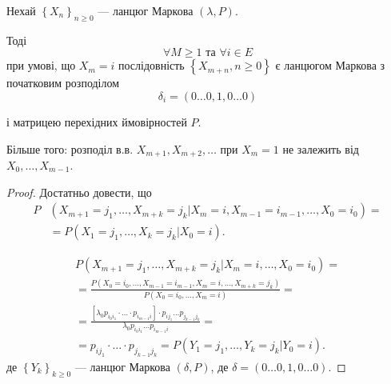 \begin{theorem}
  Нехай $\left\{ X_n \right\}_{n \geq 0} $ --- ланцюг Маркова $(\lambda, P)$.

  Тоді \[ \forall M \geq 1 \text{ та } \forall i \in  E \] при умові, що $X_m = i$
  послідовність  $\left\{ X_{m+n}, n \geq 0 \right\}$ є ланцюгом Маркова з початковим розподілом
  \[ \delta_i = \left( 0 \ldots 0, 1, 0 \ldots 0 \right) \] 

  і матрицею перехідних ймовірностей $P$.

  Більше того: розподіл в.в. $X_{m+1}, X_{m+2}, \ldots$ при $X_{m}=1$ не залежить від
  $X_0, \ldots, X_{m-1}$.
\end{theorem}

\begin{proof}
  Достатньо довести, що \[ 
   \] 
  \begin{align*}
    P &\left( X_{m+1} = j_1, \ldots, X_{m+k} = j_k | X_{m} =i, X_{m-1} = i_{m-1}, \ldots, X_0 = i_0 \right) =\\
      &= P\left( X_1 = j_1, \ldots, X_k = j_k | X_0 = i \right) 
  .\end{align*}

  \begin{align*}
    P\left( X_{m+1} = j_1, \ldots, X_{m+k} = j_k | X_{m} = i ,\ldots,X_0 = i_0 \right) = \\
    = \frac{P\left( X_0 = i_0, \ldots, X_{m-1} = i_{m-1}, X_{m}=i, \ldots, X_{m+k} = j_k \right) }{
    P\left( X_0 = i_0, \ldots, X_m = i \right) } = \\
    =  \frac{\left[ \lambda_0 p_{i_0 i_1} \cdot  \ldots \cdot p_{i_{m-1} i} \right] \cdot p_{ij_1} \ldots p_{j_{k-1}j_k}}{\lambda _0 p_{i_0 i_1} \ldots p_{i_{m-1} i}} = \\
= p_{i j_1} \cdot  \ldots \cdot p_{j_{k-1} j_k} = P\left( Y_1 = j_1, \ldots, Y_k = j_k | Y_0 = i \right) 
  .\end{align*}
  де $\left\{ Y_k \right\}_{k \geq 0}$ --- ланцюг Маркова $\left( \delta, P \right)$, де
  $\delta = \left( 0 \ldots 0, 1, 0 \ldots 0 \right) $.
\end{proof}

